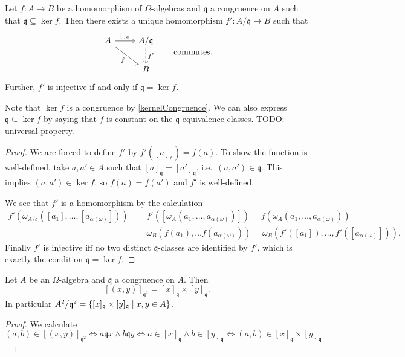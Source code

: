 \begin{proposition} \label{factorTheorem}
Let $f:A\to B$ be a homomorphism of $\Omega$-algebras and $\mathfrak{q}$ a congruence on $A$ such that $\mathfrak{q}\subseteq \ker f$. Then there exists a unique homomorphism $f': A/\mathfrak{q} \to B$ such that
\[ \begin{tikzcd}
A \arrow[r, "{[\cdot]_{\mathfrak{q}}}"] \arrow[dr, swap, "f"] & A/\mathfrak{q} \arrow[d, dashed, "{f'}"] \\
& B
\end{tikzcd} \qquad\text{commutes.} \]
Further, $f'$ is injective \textup{if and only if} $\mathfrak{q} = \ker f$.
\end{proposition}
Note that $\ker f$ is a congruence by \ref{kernelCongruence}. We can also express $\mathfrak{q}\subseteq \ker f$ by saying that $f$ is constant on the $\mathfrak{q}$-equivalence classes. TODO: universal property.
\begin{proof}
We are forced to define $f'$ by $f'([a]_\mathfrak{q}) = f(a)$. To show the function is well-defined, take $a,a'\in A$ such that $[a]_\mathfrak{q} = [a']_\mathfrak{q}$, i.e.\ $(a,a')\in \mathfrak{q}$. This implies $(a,a')\in\ker f$, so $f(a) = f(a')$ and $f'$ is well-defined.

We see that $f'$ is a homomorphism by the calculation
\begin{align*}
f'(\omega_{A/\mathfrak{q}}([a_1], \ldots, [a_{\alpha(\omega)}])) &= f'([\omega_{A}(a_1, \ldots, a_{\alpha(\omega)})]) = f(\omega_{A}(a_1, \ldots, a_{\alpha(\omega)})) \\
&= \omega_B(f(a_1), \ldots f(a_{\alpha(\omega)})) = \omega_B(f'([a_1]), \ldots, f'([a_{\alpha(\omega)}])).
\end{align*}
Finally $f'$ is injective iff no two distinct $\mathfrak{q}$-classes are identified by $f'$, which is exactly the condition $\mathfrak{q} = \ker f$.
\end{proof}

\begin{lemma}
Let $A$ be an $\Omega$-algebra and $\mathfrak{q}$ a congruence on $A$. Then
\[ [(x,y)]_{\mathfrak{q}^2} = [x]_\mathfrak{q}\times [y]_\mathfrak{q}. \]
In particular $A^2/\mathfrak{q}^2 = \setbuilder{[x]_\mathfrak{q}\times [y]_\mathfrak{q}}{x,y\in A}$.
\end{lemma}
\begin{proof}
We calculate
\[ (a,b) \in [(x,y)]_{\mathfrak{q}^2} \iff a\mathfrak{q}x \land b\mathfrak{q}y \iff a\in [x]_\mathfrak{q} \land b\in [y]_\mathfrak{q} \iff (a,b)\in [x]_\mathfrak{q}\times [y]_\mathfrak{q}. \]
\end{proof}

